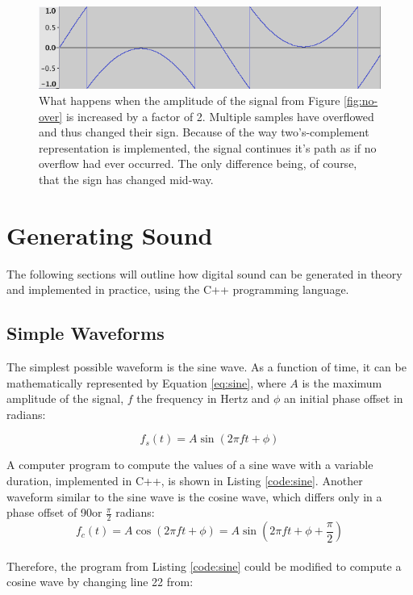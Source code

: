\documentclass[12pt,twoside]{report}
\begin{document}
\begin{figure}[h!]
  \centering
  \includegraphics[scale=0.5]{img/over}
  \caption{What happens when the amplitude of the signal from Figure \ref{fig:no-over} is increased by a factor of 2. Multiple samples have overflowed and thus changed their sign. Because of the way two's-complement representation is implemented, the signal continues it's path as if no overflow had ever occurred. The only difference being, of course, that the sign has changed mid-way. }
  \label{fig:over}
\end{figure}

\chapter{Generating Sound}

The following sections will outline how digital sound can be generated in theory and implemented in practice, using the C++ programming language.

\section{Simple Waveforms}

The simplest possible waveform is the sine wave. As a function of time, it can be mathematically represented by Equation \ref{eq:sine}, where $A$ is the maximum amplitude of the signal, $f$ the frequency in Hertz and $\phi$ an initial phase offset in radians:

\begin{equation}
  f_{s}(t) = A \sin(2 \pi  f t + \phi)
  \label{eq:sine}
\end{equation}

A computer program to compute the values of a sine wave with a variable duration, implemented in C++, is shown in Listing \ref{code:sine}. Another waveform similar to the sine wave is the cosine wave, which differs only in a phase offset of 90\degree or $\frac{\pi}{2}$ radians:\\
\begin{equation}
  f_{c}(t) = A \cos(2 \pi  f t + \phi) = A \sin(2 \pi f t + \phi + \frac{\pi}{2})
  \label{eq:cosine}
\end{equation}\\
Therefore, the program from Listing \ref{code:sine} could be modified to compute a cosine wave by changing line 22 from:\\
\end{document}
